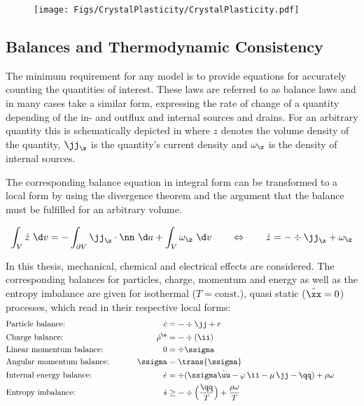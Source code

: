 \begin{figure}[h!]
  \centering
  \texttt{[image: Figs/CrystalPlasticity/CrystalPlasticity.pdf]}
\end{figure}

\subsection{Balances and Thermodynamic Consistency}
The minimum requirement for any model is to provide equations for accurately counting the quantities of interest. These laws are referred to as balance laws and in many cases take a similar form, expressing the rate of change of a quantity depending of the in- and outflux and internal sources and drains. For an arbitrary quantity this is schematically depicted in where $z$ denotes the volume density of the quantity, $\jj_\z$ is the quantity's current density and $\omega_\z$ is the density of internal sources.  

The corresponding balance equation in integral form can be transformed to a local form by using the divergence theorem and the argument that the balance must be fulfilled for an arbitrary volume.  

\begin{align}
  \int_{V} \dot z \ \d v = -\int_{\partial V} \jj_{\z} \cdot \nn \ \d a + \int_{V} \omega_{\z} \ \d v \qquad \Leftrightarrow \qquad \dot z = -\div\jj_{\z} + \omega_{\z} 
\end{align}

In this thesis, mechanical, chemical and electrical effects are considered. The corresponding balances for particles, charge, momentum and energy as well as the entropy imbalance are given for isothermal ($T=\text{const.}$), quasi static ($\ddot \xx=0$) processes, which read in their respective local forms: 
\begin{alignat}{2}
  &\text{Particle balance: } \qquad & \dot c &= -\div\jj + r  \\
  &\text{Charge balance: } \qquad  & \dot \rho^{\e} & = -\div(\ii) \\
  &\text{Linear momentum balance: } \qquad& 0 & = \div\ssigma  \\
  &\text{Angular momentum balance: } \qquad & \ssigma& = \trans{\ssigma} \\
  &\text{Internal energy balance: } \qquad & \dot e &= \div(\ssigma \dot \uu - \varphi \, \ii - \mu \, \jj - \qq) + \rho \omega \hspace{1cm}\\
  &\text{Entropy imbalance: } \qquad & \dot s &\geq -\div\Big(\frac{\qq}{T}\Big) + \frac{\rho \omega}{T}
\end{alignat}

